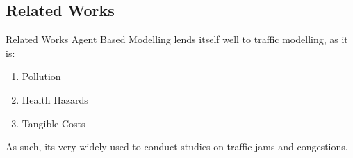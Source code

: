 \subsection{Related Works}
\begin{frame}[containsverbatim]{Related Works}
Agent Based Modelling lends itself well to traffic modelling, as it is:
\begin{enumerate}
	\item Pollution
	\item Health Hazards
	\item Tangible Costs
\end{enumerate}
As such, its very widely used to conduct studies on traffic jams and congestions.
\end{frame}